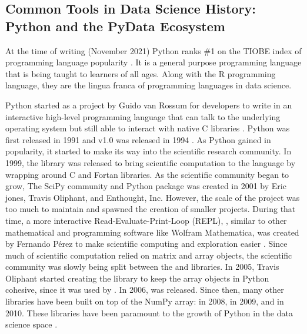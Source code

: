\documentclass[010-intro.tex]{subfiles}
\begin{document}
    \subsection{Common Tools in Data Science History: Python and the PyData Ecosystem}
    
        At the time of writing (November 2021) Python ranks \#1 on the TIOBE index
        of programming language popularity
        \cite{IndexTIOBESoftware}.
        It is a general purpose programming language that is being taught to learners of all ages.
        Along with the R programming language, they are the lingua franca of programming languages in data science.

        Python started as a project by Guido van Rossum for developers
        to write in an interactive high-level programming language that can
        talk to the underlying operating system but still able to interact with native C libraries
        \cite{severanceGuidoVanRossum2005}.
        Python was first released in 1991 and v1.0 was released in 1994
        \cite{severanceGuidoVanRossum2005}.
        As Python gained in popularity,
        it started to make its way into the scientific research community.
        In 1999, the  library was released to bring scientific computation to the language
        by wrapping around C and Fortan libraries.
        As the scientific community began to grow,
        The SciPy community and Python package was created in 2001 by Eric jones, Travis Oliphant, and Enthought, Inc.
        However, the scale of the  project was too much to maintain
        and spawned the creation of smaller  projects.
        During that time,
        a more interactive Read-Evaluate-Print-Loop (REPL),
        ,
        similar to other mathematical and programming software like Wolfram Mathematica,
        was created by Fernando Pérez to make scientific computing and exploration easier
        \cite{iPythondevelopmentteamHistory}.
        Since much of scientific computation relied on matrix and array objects,
        the scientific community was slowly being split between the  and  libraries.
        In 2005, Travis Oliphant started creating the  library to keep the array objects in Python cohesive,
        since it was used by .
        In 2006,  was released.
        Since then, many other libraries have been built on top of the NumPy array:
         in 2008,  in 2009, and  in 2010.
        These libraries have been paramount to the growth of Python in the data science space
        \cite{daskKeynotePeterWang2021}. %
\end{document}
